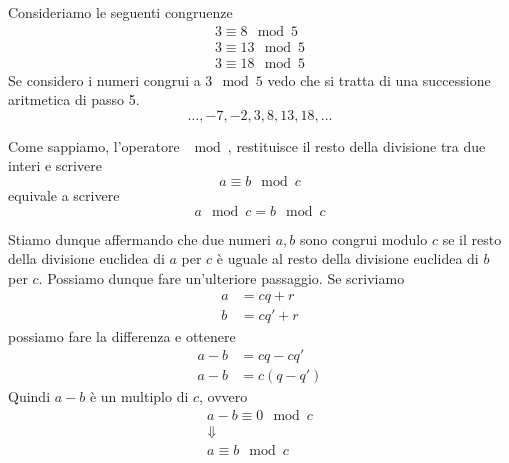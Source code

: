 \begin{example}
	Consideriamo le seguenti congruenze
	\begin{equation*}
		\begin{array}{l}
			3 \equiv 8 \mod{5}  \\
			3 \equiv 13 \mod{5} \\
			3 \equiv 18 \mod{5}
		\end{array}
	\end{equation*}
	Se considero i numeri congrui a $3 \mod{5}$ vedo che si tratta di una successione
	aritmetica di passo 5.
	\begin{equation*}
		\dots, -7, -2, 3, 8, 13, 18, \dots
	\end{equation*}
\end{example}

\begin{observation}
	Come sappiamo, l'operatore $\mod{}$, restituisce il resto della divisione tra due interi e
	scrivere
	\begin{equation*}
		a \equiv b \mod{c}
	\end{equation*}
	equivale a scrivere
	\begin{equation*}
		a \mod{c} = b \mod{c}
	\end{equation*}
\end{observation}

Stiamo dunque affermando che due numeri $a, b$ sono congrui modulo $c$ se il resto della
divisione euclidea di $a$ per $c$ \`e uguale al resto della divisione euclidea di $b$ per $c$.
Possiamo dunque fare un'ulteriore passaggio. Se scriviamo
\begin{equation*}
	\begin{array}{rl}
		a & = cq + r  \\
		b & = cq' + r
	\end{array}
\end{equation*}
possiamo fare la differenza e ottenere
\begin{equation*}
	\begin{array}{rl}
		a - b & = cq - cq'  \\
		a - b & = c(q - q')
	\end{array}
\end{equation*}
Quindi $a - b$ \`e un multiplo di $c$, ovvero
\begin{equation*}
	\begin{array}{c}
		a - b \equiv 0 \mod{c} \\
		\Downarrow             \\
		a \equiv b \mod{c}
	\end{array}
\end{equation*}

